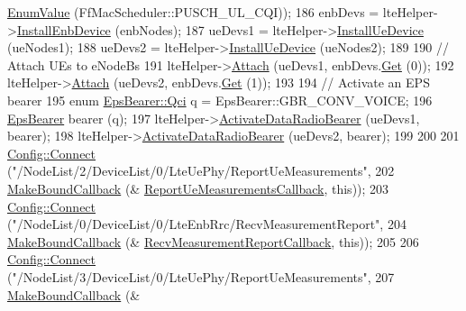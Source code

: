\begin{DoxyCode}
      \hyperlink{classns3_1_1EnumValue}{EnumValue} (FfMacScheduler::PUSCH\_UL\_CQI));
186   enbDevs = lteHelper->\hyperlink{classns3_1_1LteHelper_a5e009ad35ef85f46b5a6099263f15a03}{InstallEnbDevice} (enbNodes);
187   ueDevs1 = lteHelper->\hyperlink{classns3_1_1LteHelper_ac9cd932d7de92811cfa953c2e3b2fc9f}{InstallUeDevice} (ueNodes1);
188   ueDevs2 = lteHelper->\hyperlink{classns3_1_1LteHelper_ac9cd932d7de92811cfa953c2e3b2fc9f}{InstallUeDevice} (ueNodes2);
189 
190   \textcolor{comment}{// Attach UEs to eNodeBs}
191   lteHelper->\hyperlink{classns3_1_1LteHelper_a9466743f826aa2652a87907b7f0a1c87}{Attach} (ueDevs1, enbDevs.\hyperlink{classns3_1_1NetDeviceContainer_a677d62594b5c9d2dea155cc5045f4d0b}{Get} (0));
192   lteHelper->\hyperlink{classns3_1_1LteHelper_a9466743f826aa2652a87907b7f0a1c87}{Attach} (ueDevs2, enbDevs.\hyperlink{classns3_1_1NetDeviceContainer_a677d62594b5c9d2dea155cc5045f4d0b}{Get} (1));
193 
194   \textcolor{comment}{// Activate an EPS bearer}
195   \textcolor{keyword}{enum} \hyperlink{structns3_1_1EpsBearer_aecf0c67109c5eb4ec0b07226fff5885e}{EpsBearer::Qci} q = EpsBearer::GBR\_CONV\_VOICE;
196   \hyperlink{structns3_1_1EpsBearer}{EpsBearer} bearer (q);
197   lteHelper->\hyperlink{classns3_1_1LteHelper_ac896e16cf162e4beeaa292d39ab1b700}{ActivateDataRadioBearer} (ueDevs1, bearer);
198   lteHelper->\hyperlink{classns3_1_1LteHelper_ac896e16cf162e4beeaa292d39ab1b700}{ActivateDataRadioBearer} (ueDevs2, bearer);
199 
200 
201   \hyperlink{group__config_ga4014f151241cd0939b6cb64409605736}{Config::Connect} (\textcolor{stringliteral}{"/NodeList/2/DeviceList/0/LteUePhy/ReportUeMeasurements"},
202                    \hyperlink{group__makeboundcallback_ga1725d6362e6065faa0709f7c93f8d770}{MakeBoundCallback} (&
      \hyperlink{lte-test-ue-measurements_8cc_a47cd94bfad5174d824825900b4dc62c9}{ReportUeMeasurementsCallback}, \textcolor{keyword}{this}));
203   \hyperlink{group__config_ga4014f151241cd0939b6cb64409605736}{Config::Connect} (\textcolor{stringliteral}{"/NodeList/0/DeviceList/0/LteEnbRrc/RecvMeasurementReport"},
204                    \hyperlink{group__makeboundcallback_ga1725d6362e6065faa0709f7c93f8d770}{MakeBoundCallback} (&
      \hyperlink{lte-test-ue-measurements_8cc_aef7d01f73ec41364e58842fcbcc4adad}{RecvMeasurementReportCallback}, \textcolor{keyword}{this}));
205 
206   \hyperlink{group__config_ga4014f151241cd0939b6cb64409605736}{Config::Connect} (\textcolor{stringliteral}{"/NodeList/3/DeviceList/0/LteUePhy/ReportUeMeasurements"},
207                    \hyperlink{group__makeboundcallback_ga1725d6362e6065faa0709f7c93f8d770}{MakeBoundCallback} (&

\end{DoxyCode}
